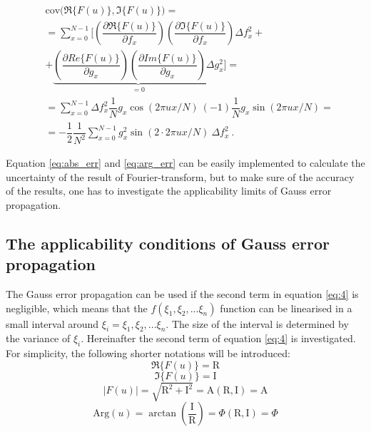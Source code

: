 \documentclass[a4paper,12pt,oneside]{article}
\newcommand{\Abs}{\mathrm{A}}
\newcommand{\Arg}{\Phi}
\newcommand{\R}{\mathrm{R}}
\newcommand{\I}{\mathrm{I}}
\begin{document}
\begin{eqnarray}\label{eq:cov1}
  & \mathrm{cov} \Big( \Re\{F(u)\}, \Im\{F(u)\} \Big) = \nonumber\\
  & = \sum\limits_{x=0}^{N-1} \Bigg[
  \left( \dfrac{\partial \Re\{ F(u) \}}{\partial f_x} \right) \left( \dfrac{\partial \Im\{ F(u) \}}{\partial f_x} \right) \Delta f_x^2 + \nonumber\\
  & + \underbrace{ \left( \dfrac{\partial Re\{ F(u) \}}{\partial g_x} \right) \left( \dfrac{\partial Im\{ F(u) \}}{\partial g_x} \right) \Delta g_x^2}_\text{$=0$} \Bigg] = \nonumber\\
  & = \sum\limits_{x=0}^{N-1} \Delta f_x^2 \dfrac{1}{N} g_x \cos(2\pi ux/N)\ (-1) \dfrac{1}{N} g_x \sin(2\pi ux/N) = \nonumber\\
  & = -\dfrac{1}{2} \dfrac{1}{N^2} \sum\limits_{x=0}^{N-1} g_x^2 \sin(2 \cdot 2\pi ux/N)\ \Delta f_x^2 \ .
\end{eqnarray}

Equation \eqref{eq:abs_err} and \eqref{eq:arg_err} can be easily implemented to calculate the uncertainty of the result of Fourier-transform, but to make sure of the accuracy of the results, one has to investigate the applicability limits of Gauss error propagation.

\subsection{The applicability conditions of Gauss error propagation}\label{sec:limits}

The Gauss error propagation can be used if the second term in equation \eqref{eq:4} is negligible, which means that the $f(\xi_1, \xi_2, ... \xi_n)$ function can be linearised in a small interval around $\xi_i = \xi_1, \xi_2, ... \xi_n$. The size of the interval is determined by the variance of $\xi_i$. Hereinafter the second term of equation \eqref{eq:4} is investigated. For simplicity, the following shorter notations will be introduced:
$$\Re\{F(u)\} = \R$$
$$\Im\{F(u)\} = \I$$
$$|F(u)| = \sqrt{\R^2 + \I^2} = \Abs(\R, \I) = \Abs$$
$$\mathrm{Arg}(u) = \arctan\left({\frac{\I}{\R}}\right) = \Arg(\R, \I) = \Arg$$
\end{document}
